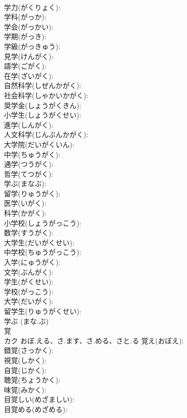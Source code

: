 \documentclass[8pt]{extreport}
\begin{document}
\begin{CJK}{UTF8}{min}
\\	学力(がくりょく): 
\\	学科(がっか): 
\\	学会(がっかい): 
\\	学期(がっき): 
\\	学級(がっきゅう): 
\\	見学(けんがく): 
\\	語学(ごがく): 
\\	在学(ざいがく): 
\\	自然科学(しぜんかがく): 
\\	社会科学(しゃかいかがく): 
\\	奨学金(しょうがくきん): 
\\	小学生(しょうがくせい): 
\\	進学(しんがく): 
\\	人文科学(じんぶんかがく): 
\\	大学院(だいがくいん): 
\\	中学(ちゅうがく): 
\\	通学(つうがく): 
\\	哲学(てつがく): 
\\	学ぶ(まなぶ): 
\\	留学(りゅうがく): 
\\	医学(いがく): 
\\	科学(かがく): 
\\	小学校(しょうがっこう): 
\\	数学(すうがく): 
\\	大学生(だいがくせい): 
\\	中学校(ちゅうがっこう): 
\\	入学(にゅうがく): 
\\	文学(ぶんがく): 
\\	学生(がくせい): 
\\	学校(がっこう): 
\\	大学(だいがく): 
\\	留学生(りゅうがくせい): 
\\	学ぶ (まな.ぶ)
\\	覚			
\\	カク	おぼ.える、さ.ます、さ.める、さと.る	覚え(おぼえ): 
\\	錯覚(さっかく): 
\\	視覚(しかく): 
\\	自覚(じかく): 
\\	聴覚(ちょうかく): 
\\	味覚(みかく): 
\\	目覚しい(めざましい): 
\\	目覚める(めざめる): 

\end{CJK}
\end{document}
